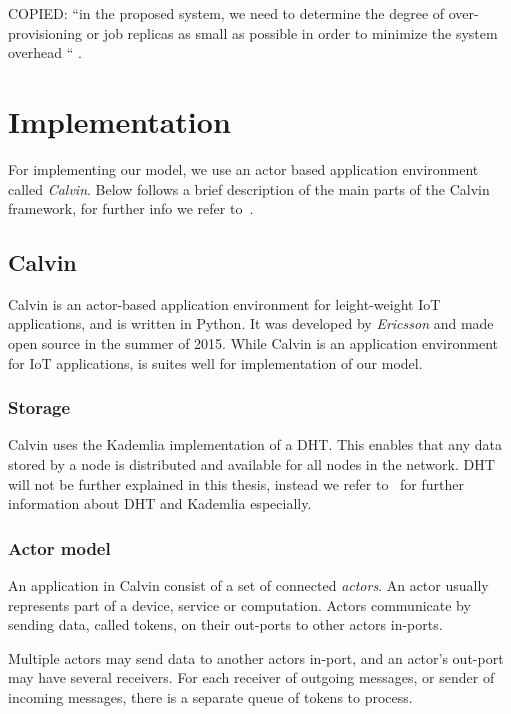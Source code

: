 \documentclass{cslthse-msc}
\begin{document}
COPIED: “in the proposed system, we need to determine the degree of over-provisioning or job replicas as small as possible in order to minimize the system overhead “ \cite{designFaultTolerantSched}.
\fi

\section{Implementation} \label{sec:design_implementation}
For implementing our model, we use an actor based application environment called \emph{Calvin}. Below follows a brief description of the main parts of the Calvin framework, for further info we refer to~\cite{calvin}.

\subsection{Calvin} \label{subsec:design_calvin}
Calvin is an actor-based application environment for leight-weight IoT applications, and is written in Python. It was developed by \emph{Ericsson} and made open source in the summer of 2015. While Calvin is an application environment for IoT applications, is suites well for implementation of our model.

\subsubsection{Storage} \label{sec:calvin_storage}
Calvin uses the Kademlia implementation of a DHT. This enables that any data stored by a node is distributed and available for all nodes in the network. DHT will not be further explained in this thesis, instead we refer to~\cite{kademlia} for further information about DHT and Kademlia especially.

\subsubsection{Actor model}
An application in Calvin consist of a set of connected \emph{actors}. An actor usually represents part of a device, service or computation. Actors communicate by sending data, called tokens, on their out-ports to other actors in-ports. 

Multiple actors may send data to another actors in-port, and an actor's out-port may have several receivers. For each receiver of outgoing messages, or sender of incoming messages, there is a separate queue of tokens to process.
\end{document}
